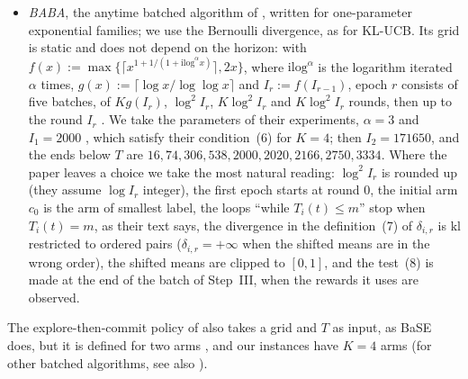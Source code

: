 \documentclass[10pt]{article}
\newcommand{\1}{\mathbf{1}}
\newcommand{\kl}{\mathrm{kl}}
\begin{document}
\begin{itemize}[leftmargin=*]
mean by at least $\sqrt{\gamma\log(TK)/\tau}$, where $\tau$ is the smallest count of an active arm; after the last end before $T$ it commits to the active
arm of largest mean. We take $\gamma=1$, the value of their experiments \citep[Section~4]{GHRZ19}; their Theorem~4 asks $\gamma\ge12$, with which BaSE eliminates
fewer arms before $T$ and, on the three grids with $x=1$ (instance A) and on the geometric grid (instance C), ends with a regret of $1900$
to $2050$ at $T$, against $200$ to $330$ with $\gamma=1$: the value $\gamma=1$ favours BaSE.
\item \emph{BABA}, the anytime batched algorithm of \citet[Algorithms~1--6]{JTXHXG21}, written for one-parameter exponential families; we use the
Bernoulli divergence, as for KL-UCB. Its grid is static and does not depend on the horizon: with $f(x):=\max\{\lceil x^{1+1/(1+\mathrm{ilog}^\alpha x)}\rceil,2x\}$,
where $\mathrm{ilog}^\alpha$ is the logarithm iterated $\alpha$ times, $g(x):=\lceil\log x/\log\log x\rceil$ and $I_r:=f(I_{r-1})$, epoch $r$ consists of five
batches, of $Kg(I_r)$, $\log^2I_r$, $K\log^2I_r$ and $K\log^2I_r$ rounds, then up to the round $I_r$ \citep[Section~3.1]{JTXHXG21}. We take the parameters of their
experiments, $\alpha=3$ and $I_1=2000$ \citep[Section~6]{JTXHXG21}, which satisfy their condition~(6) for $K=4$; then $I_2=171650$, and the ends below $T$ are
$16,74,306,538,2000,2020,2166,2750,3334$. Where the paper leaves a choice we take the most natural reading: $\log^2I_r$ is rounded up (they assume
$\log I_r$ integer), the first epoch starts at round $0$, the initial arm $c_0$ is the arm of smallest label, the loops ``while $T_i(t)\le m$'' stop when
$T_i(t)=m$, as their text says, the divergence in the definition~(7) of $\delta_{i,r}$ is $\kl$ restricted to ordered pairs ($\delta_{i,r}=+\infty$ when the
shifted means are in the wrong order), the shifted means are clipped to $[0,1]$, and the test~(8) is made at the end of the batch of Step~III, when the
rewards it uses are observed.
\end{itemize}
The explore-then-commit policy of \citet[Figure~1]{PRCS16} also takes a grid and $T$ as input, as BaSE does, but it is defined for two arms
\citep[Section~2.2]{PRCS16}, and our instances have $K=4$ arms (for other batched algorithms, see also \citealp{EKMM21,KMS21}).
\end{document}
